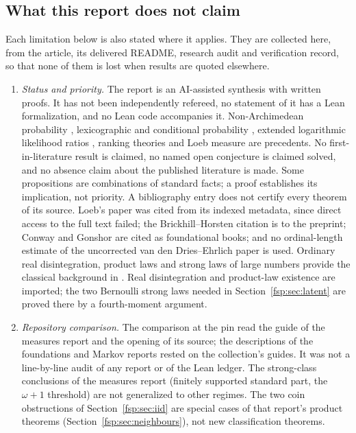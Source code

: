 \documentclass[11pt,a4paper]{article}
\numberwithin{equation}{section}
\theoremstyle{definition}
\theoremstyle{remark}
\begin{document}
\subsection{What this report does not claim}\label{fsp:sec:nonclaims}
Each limitation below is also stated where it applies. They are collected
here, from the article, its delivered README, research audit and verification
record, so that none of them is lost when results are quoted elsewhere.
\begin{enumerate}[label=(N\arabic*),leftmargin=3.2em]
\item \emph{Status and priority.} The report is an AI-assisted synthesis with
written proofs. It has not been independently refereed, no statement of it has
a Lean formalization, and no Lean code accompanies it. Non-Archimedean
probability \cite{bhw}, lexicographic and conditional probability
\cite{halpern,brickhill}, extended logarithmic likelihood ratios
\cite{hammond}, ranking theories \cite{spohn} and Loeb measure \cite{loeb} are
precedents. No first-in-literature result is claimed, no named open
conjecture is claimed solved, and no absence claim about the published
literature is made. Some propositions are combinations of standard facts; a
proof establishes its implication, not priority. A bibliography entry does not
certify every theorem of its source. Loeb's paper was cited from its indexed
metadata, since direct access to the full text failed; the Brickhill--Horsten
citation is to the preprint; Conway and Gonshor are cited as foundational books;
and no ordinal-length estimate of the uncorrected van den Dries--Ehrlich paper is
used. Ordinary real disintegration, product laws and strong laws of large
numbers provide the classical background in \cite{kallenberg}. Real
disintegration and product-law existence are imported; the two Bernoulli
strong laws needed in Section~\ref{fsp:sec:latent} are proved there by a
fourth-moment argument.
\item \emph{Repository comparison.} The comparison at the pin read the guide of
the measures report and the opening of its source; the descriptions of the
foundations and Markov reports rested on the collection's guides. It was not a
line-by-line audit of any report or of the Lean ledger. The strong-class
conclusions of the measures report (finitely supported standard part, the
$\omega+1$ threshold) are not generalized to other regimes. The two coin
obstructions of Section~\ref{fsp:sec:iid} are special cases of that report's
product theorems (Section~\ref{fsp:sec:neighbours}), not new classification
theorems.

\end{enumerate}
\end{document}

